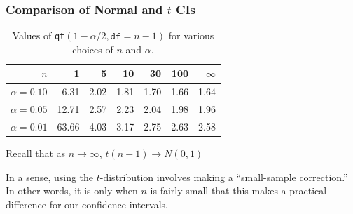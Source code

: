 \documentclass[handout]{beamer}
\begin{document}
\begin{frame}
\frametitle{Comparison of Normal and $t$ CIs}
\begin{table}
\caption{Values of \texttt{qt}$(1-\alpha/2, \texttt{df}=n-1)$ for various choices of $n$ and $\alpha$. }
\begin{tabular}{r|rrrrr|r}
\hline
$n$& 1& 5& 10& 30& 100 & $\infty$\\
\hline
$\alpha = 0.10$&  6.31& 2.02 & 1.81 & 1.70  & 1.66 &1.64\\
$\alpha = 0.05$ & 12.71& 2.57 & 2.23 & 2.04  & 1.98 &1.96\\
$\alpha = 0.01$ & 63.66& 4.03 & 3.17 & 2.75  & 2.63 &2.58\\
\hline
\end{tabular}
\end{table}
\alert{Recall that as $n\rightarrow \infty$, $t(n-1) \rightarrow N(0,1)$}
\vspace{1em}


In a sense, using the $t$-distribution involves making a ``small-sample correction.'' In other words, it is only when $n$ is fairly small that this makes a practical difference for our confidence intervals.
\end{frame}
\end{document}
